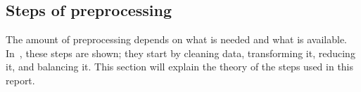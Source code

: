 \subsection{Steps of preprocessing}\label{subsec:preprocessing-steps}
The amount of preprocessing depends on what is needed and what is available. In~\cite{Data-preprocessing-for-flight-delays}, these steps are shown; they start by cleaning data, transforming it, reducing it, and balancing it. This section will explain the theory of the steps used in this report.













